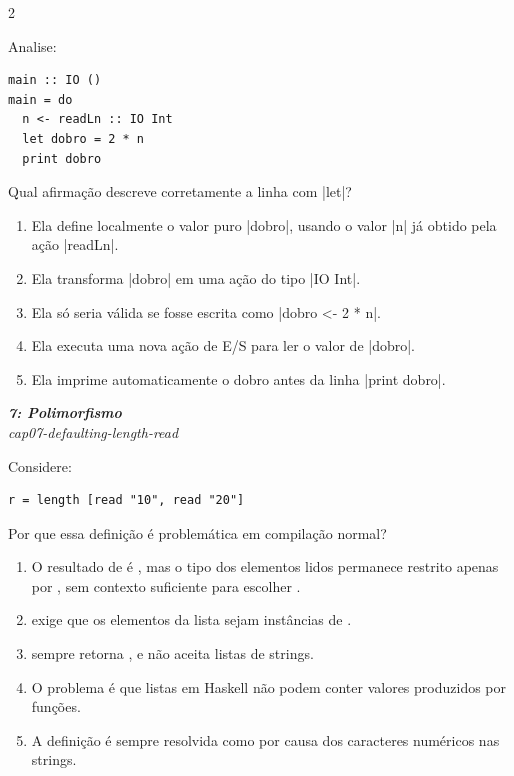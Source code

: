 \documentclass[a4paper,10pt,brazil]{article}
\begin{document}
\begin{multicols}{2}
\begin{flushright}
\end{flushright}
Analise:

\begin{verbatim}
main :: IO ()
main = do
  n <- readLn :: IO Int
  let dobro = 2 * n
  print dobro
\end{verbatim}

Qual afirmação descreve corretamente a linha com \haskellinline|let|?

\begin{enumerate}
  \item Ela define localmente o valor puro \haskellinline|dobro|, usando o valor \haskellinline|n| já obtido pela ação \haskellinline|readLn|.

  \item Ela transforma \haskellinline|dobro| em uma ação do tipo \haskellinline|IO Int|.

  \item Ela só seria válida se fosse escrita como \haskellinline|dobro <- 2 * n|.

  \item Ela executa uma nova ação de E/S para ler o valor de \haskellinline|dobro|.

  \item Ela imprime automaticamente o dobro antes da linha \haskellinline|print dobro|.


\end{enumerate}

\begin{flushright}
  \footnotesize
  \textit{\textbf{7: Polimorfismo}}\\
  \textit{cap07-defaulting-length-read}\\

\end{flushright}
Considere:

\begin{verbatim}
r = length [read "10", read "20"]
\end{verbatim}

Por que essa definição é problemática em compilação normal?

\begin{enumerate}
  \item O resultado de  é , mas o tipo dos elementos lidos permanece restrito apenas por , sem contexto suficiente para escolher .
  \item {} exige que os elementos da lista sejam instâncias de .
  \item {} sempre retorna , e  não aceita listas de strings.
  \item O problema é que listas em Haskell não podem conter valores produzidos por funções.
  \item A definição é sempre resolvida como \haskellinline{[Int]} por causa dos caracteres numéricos nas strings.


\end{enumerate}
\end{multicols}
\end{document}

